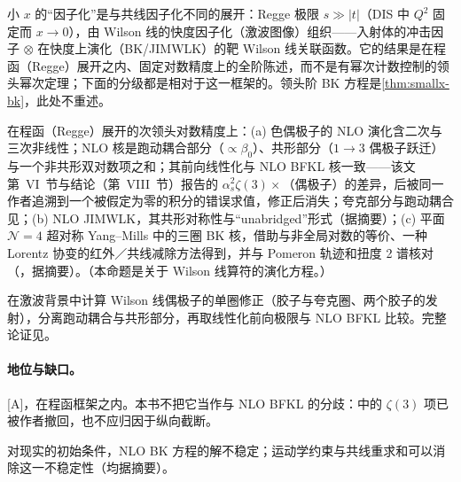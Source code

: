 小 $x$ 的“因子化”是与共线因子化不同的展开：Regge 极限 $s\gg|t|$（DIS 中 $Q^2$ 固定而 $x\to0$），由 Wilson 线的快度因子化（激波图像）组织——入射体的冲击因子 $\otimes$ 在快度上演化（BK/JIMWLK）的靶 Wilson 线关联函数。它的结果是在程函（Regge）展开之内、固定对数精度上的全阶陈述，而不是有幂次计数控制的领头幂次定理；下面的分级都是相对于这一框架的。领头阶 BK 方程是\cref{thm:smallx-bk}，此处不重述。

\begin{proposition}\label{prop:front-nlo-bk}
在程函（Regge）展开的次领头对数精度上：(a) 色偶极子的 NLO 演化含二次与三次非线性；NLO 核是跑动耦合部分（$\propto\beta_0$）、共形部分（$1\to3$ 偶极子跃迁）与一个非共形双对数项之和；其前向线性化与 NLO BFKL 核一致\cite{Balitsky:2007feb}——该文第~VI~节与结论（第~VIII~节）报告的 $\alpha_s^2\zeta(3)\times$（偶极子）的差异，后被同一作者追溯到一个被假定为零的积分的错误求值，修正后消失\cite[第~6~节，“In QCD”]{Balitsky:2009xg}；夸克部分与跑动耦合见\cite{Balitsky:2006wa,Kovchegov:2006vj}；(b) NLO JIMWLK\cite{Balitsky:2013fea,Kovner:2013ona}，其共形对称性\cite{Kovner:2014xia}与“unabridged”形式\cite{Kovner:2014lca}（据摘要）；(c) 平面 $\mathcal N=4$ 超对称 Yang--Mills 中的三圈 BK 核，借助与非全局对数的等价、一种 Lorentz 协变的红外／共线减除方法得到，并与 Pomeron 轨迹和扭度 2 谱核对（\cite{Caron-Huot:2016tzz}，据摘要）。（本命题是关于 Wilson 线算符的演化方程。）
\end{proposition}

\begin{proofsketch}
在激波背景中计算 Wilson 线偶极子的单圈修正（胶子与夸克圈、两个胶子的发射），分离跑动耦合与共形部分，再取线性化前向极限与 NLO BFKL 比较。完整论证见\cite{Balitsky:2007feb,Balitsky:2009xg}。
\end{proofsketch}

\paragraph{地位与缺口。}[A]，在程函框架之内。本书不把它当作与 NLO BFKL 的分歧：\cite{Balitsky:2007feb}中的 $\zeta(3)$ 项已被作者撤回\cite[第~6~节]{Balitsky:2009xg}，也不应归因于纵向截断。

\begin{proposition}\label{prop:front-bk-collinear}
对现实的初始条件，NLO BK 方程的解不稳定\cite{Lappi:2015fma}；运动学约束与共线重求和可以消除这一不稳定性\cite{Beuf:2014uia,Iancu:2015vea}（均据摘要）。
\end{proposition}

